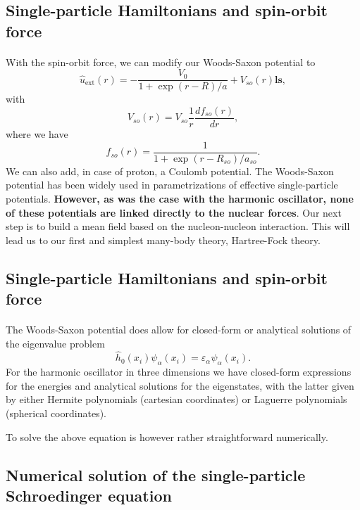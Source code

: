 \documentclass[%
twoside,                 %
final,                   %
10pt]{article}
\begin{document}
\subsection*{Single-particle Hamiltonians and spin-orbit force}

\paragraph{}
With the spin-orbit force, we can modify our Woods-Saxon potential to 
\[
\hat{u}_{\mathrm{ext}}(r)=-\frac{V_0}{1+\exp{(r-R)/a}}+V_{so}(r)\bm{ls},
\]
with
\[
V_{so}(r) = V_{so}\frac{1}{r}\frac{d f_{so}(r)}{dr},
\]
where we have 
\[
f_{so}(r) = \frac{1}{1+\exp{(r-R_{so})/a_{so}}}.
\]
We can also add, in case of proton, a Coulomb potential. The Woods-Saxon potential has been widely used in parametrizations of
effective single-particle potentials. \textbf{However, as was the case with the harmonic oscillator, none of these potentials are linked directly to the nuclear forces}. Our next step is to build a mean field based on the nucleon-nucleon interaction.
This will lead us to our first and simplest many-body theory, Hartree-Fock theory.




\subsection*{Single-particle Hamiltonians and spin-orbit force}

\paragraph{}
The Woods-Saxon potential does allow for closed-form or analytical solutions of the eigenvalue problem
\[
  \hat{h}_0(x_i)\psi_{\alpha}(x_i)=\varepsilon_{\alpha}\psi_{\alpha}(x_i).  
\]
For the harmonic oscillator in three dimensions we have closed-form expressions for the energies and analytical solutions for the eigenstates,
with the latter given by either Hermite polynomials (cartesian coordinates) or Laguerre polynomials (spherical coordinates).

To solve the above equation is however rather straightforward numerically.



\subsection*{Numerical solution of the single-particle Schroedinger equation}
\end{document}
